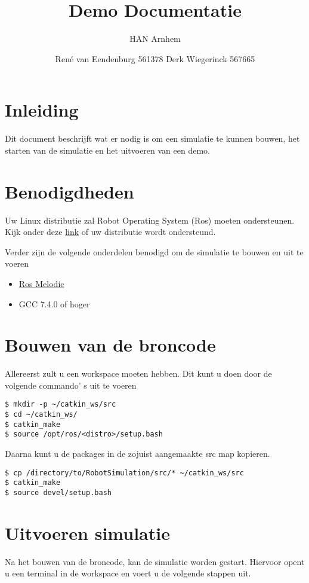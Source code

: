 \documentclass[11pt,titlepage]{article}
\author{René van Eendenburg 561378 \cr Derk Wiegerinck 567665}
\title{Demo Documentatie}
\subtitle{HAN Arnhem}{Versie 1}{WOR-World}
\begin{document}
\maketitle



\tableofcontents
\clearpage


\section{Inleiding}
Dit document beschrijft wat er nodig is om een simulatie te kunnen bouwen, het starten van de simulatie en het uitvoeren van een demo.

\section{Benodigdheden}
Uw Linux distributie zal Robot Operating System (Ros) moeten ondersteunen. Kijk onder deze \href{https://www.ros.org/reps/rep-0003.html}{link} of uw distributie wordt ondersteund.

Verder zijn de volgende onderdelen benodigd om de simulatie te bouwen en uit te voeren
\begin{itemize}
    \item \href{http://wiki.ros.org/melodic/Installation}{Ros Melodic}
    \item GCC 7.4.0 of hoger
\end{itemize}

\section{Bouwen van de broncode}
Allereerst zult u een workspace moeten hebben. Dit kunt u doen door de volgende commando' s uit te voeren

\begin{verbatim}
$ mkdir -p ~/catkin_ws/src
$ cd ~/catkin_ws/
$ catkin_make
$ source /opt/ros/<distro>/setup.bash
\end{verbatim}

Daarna kunt u de packages in de zojuist aangemaakte src map kopieren. 

\begin{verbatim}
$ cp /directory/to/RobotSimulation/src/* ~/catkin_ws/src
$ catkin_make
$ source devel/setup.bash
\end{verbatim}

\section{Uitvoeren simulatie}
Na het bouwen van de broncode, kan de simulatie worden gestart. Hiervoor opent u een terminal in de workspace en voert u de volgende stappen uit.
\end{document}
